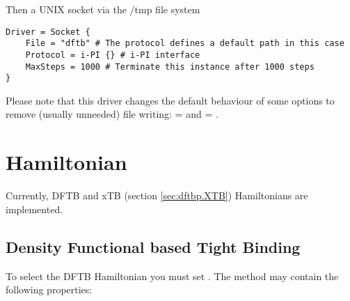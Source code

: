 Then a UNIX socket via the /tmp file system
\begin{verbatim}
Driver = Socket {
    File = "dftb" # The protocol defines a default path in this case
    Protocol = i-PI {} # i-PI interface
    MaxSteps = 1000 # Terminate this instance after 1000 steps
}
\end{verbatim}

Please note that this driver changes the default behaviour of some options to
remove (usually unneeded) file writing:  =  and
 = .


\section{Hamiltonian}
\label{sec:dftbp.Hamiltonian}

Currently, DFTB and xTB (section \ref{sec:dftbp.XTB}) Hamiltonians are
implemented.

\subsection{Density Functional based Tight Binding}
\label{sec:dftbp.DFTB}

To select the DFTB Hamiltonian you must set . The  method may contain the following properties:

